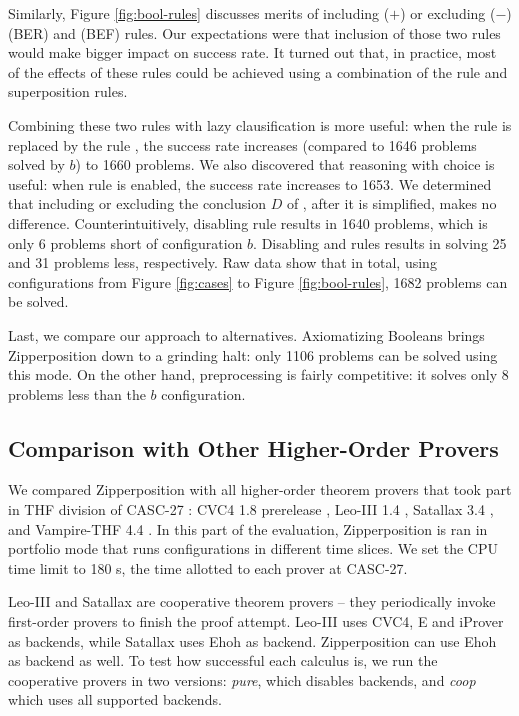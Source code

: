 Similarly, Figure \ref{fig:bool-rules} discusses merits of including ($+$) or
excluding ($-$)  (BER) and  (BEF) rules. Our
expectations were that inclusion of those two rules would make bigger impact on
success rate. It turned out that, in practice, most of the effects of these
rules could be achieved using a combination of the  rule and
superposition rules.
\pagebreak[2]

Combining these two rules with lazy clausification is more useful: when the rule
 is replaced by the rule , the success rate increases
(compared to 1646 problems solved by $b$) to 1660 problems. We also discovered
that reasoning with choice is useful: when rule  is enabled, the
success rate increases to 1653. We determined that including or excluding the
conclusion $D$ of , after it is simplified, makes no difference.
Counterintuitively, disabling  rule results in 1640 problems,
which is only 6 problems short of configuration $b$. Disabling  and
 rules results in solving 25 and 31 problems less,
respectively. Raw data show that in total, using configurations from Figure
\ref{fig:cases} to Figure \ref{fig:bool-rules}, 1682 problems can be solved.

Last, we compare our approach to alternatives. Axiomatizing Booleans brings
Zipperposition down to a grinding halt: only 1106 problems can be solved using
this mode. On the other hand, preprocessing is fairly competitive: it solves
only 8 problems less than the $b$ configuration.


\subsection{Comparison with Other Higher-Order Provers} 

We compared Zipperposition with all higher-order theorem provers that took part
in THF division of CASC-27 \cite{gs-19-casc27}: CVC4 1.8 prerelease \cite{cbetal-11-cvc4},
Leo-III 1.4 \cite{sb-21-leo3}, Satallax 3.4
\cite{cb-12-satallax}, and Vampire-THF 4.4
\cite{lkav-13-vampire}. In this part of the evaluation, Zipperposition is ran
in portfolio mode that runs configurations in different time slices. 
We set the CPU time limit to 180 s, the time allotted to each prover at CASC-27.


Leo-III and Satallax are cooperative theorem provers -- they periodically invoke
first-order provers to finish the proof attempt. Leo-III uses CVC4, E and
iProver \cite{kk-08-iprover} as backends, while Satallax uses Ehoh
 as backend. Zipperposition can use Ehoh as backend as well. To test how successful each calculus is, we run
the cooperative provers in two versions: \emph{pure}, which disables backends,
and \emph{coop} which uses all supported backends.



